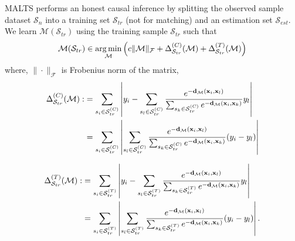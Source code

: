 MALTS performs an honest causal inference by splitting the observed sample dataset $\mathcal{S}_n$ into a training set $\mathcal{S}_{tr}$ (not for matching) and an estimation set $\mathcal{S}_{est}$.
We learn $\mathcal{M}(\mathcal{S}_{tr})$ using the training sample $\mathcal{S}_{tr}$ such that 
\begin{equation}
    \mathcal{M}(\mathcal{S}_{tr}) \in \operatorname*{arg\,min}_{\mathcal{M}} \left( c\|\mathcal{M}\|_\mathcal{F} + \Delta^{(C)}_{\mathcal{S}_{tr}}(\mathcal{M}) + \Delta^{(T)}_{\mathcal{S}_{tr}}(\mathcal{M}) \right)
\end{equation}
where,
$\|\cdot\|_{\mathcal{F}}$ is Frobenius norm of the matrix,
\begin{equation}
\begin{split}
    \Delta^{(C)}_{\mathcal{S}_{tr}}(\mathcal{M}) :&= \sum_{s_i\in\mathcal{S}^{(C)}_{tr}}\left| y_i - \sum_{s_l \in \mathcal{S}^{(C)}_{tr}} \frac{e^{-\mathbf{d}_\mathcal{M}(\mathbf{x}_i,\mathbf{x}_l)}}{\sum_{s_k \in \mathcal{S}^{(C)}_{tr}} e^{-\mathbf{d}_\mathcal{M}(\mathbf{x}_i,\mathbf{x}_k)}}y_l  \right| \\ &= \sum_{s_i\in\mathcal{S}^{(C)}_{tr}}\left|\sum_{s_l \in \mathcal{S}^{(C)}_{tr}} \frac{e^{-\mathbf{d}_\mathcal{M}(\mathbf{x}_i,\mathbf{x}_l)}}{\sum_{s_k \in \mathcal{S}^{(C)}_{tr}} e^{-\mathbf{d}_\mathcal{M}(\mathbf{x}_i,\mathbf{x}_k)}}(y_i-y_l)  \right|
\end{split}
\end{equation}

\begin{equation}
\begin{split}
    \Delta^{(T)}_{\mathcal{S}_{tr}}(\mathcal{M}) :&= \sum_{s_i\in\mathcal{S}^{(T)}_{tr}}\left| y_i - \sum_{s_l \in \mathcal{S}^{(T)}_{tr}} \frac{e^{-\mathbf{d}_\mathcal{M}(\mathbf{x}_i,\mathbf{x}_l)}}{\sum_{s_k \in \mathcal{S}^{(T)}_{tr}} e^{-\mathbf{d}_\mathcal{M}(\mathbf{x}_i,\mathbf{x}_k)}}y_l  \right| \\ &= \sum_{s_i\in\mathcal{S}^{(T)}_{tr}}\left|\sum_{s_l \in \mathcal{S}^{(T)}_{tr}} \frac{e^{-\mathbf{d}_\mathcal{M}(\mathbf{x}_i,\mathbf{x}_l)}}{\sum_{s_k \in \mathcal{S}^{(T)}_{tr}} e^{-\mathbf{d}_\mathcal{M}(\mathbf{x}_i,\mathbf{x}_k)}}(y_i-y_l)\right|. 
\end{split}
\end{equation}


